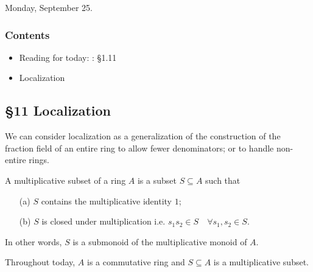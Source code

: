Monday, September 25.

\subsubsection*{Contents}
\begin{itemize}
    \item Reading for today: : \S 1.11
    \item Localization
\end{itemize}

\subsection*{\S11 Localization}
We can consider localization as a generalization of the construction of the fraction field of an entire ring to allow fewer denominators; or to handle non-entire rings.

\begin{definition}
    A multiplicative subset of a ring $A$ is a subset $S \subseteq A$ such that
    \begin{itemize}
        \item[(a)] $S$ contains the multiplicative identity $1$;
        \item[(b)] $S$ is closed under multiplication i.e. $s_1 s_2 \in S \quad \forall s_1, s_2 \in S$.
    \end{itemize}
    In other words, $S$ is a submonoid of the multiplicative monoid of $A$.
\end{definition}

\noindent
Throughout today, $A$ is a commutative ring and $S\subseteq A$ is a multiplicative subset.


